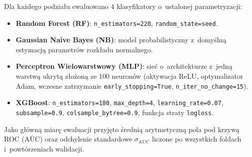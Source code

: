 Dla każdego podziału ewaluowano 4 klasyfikatory o~ustalonej parametryzacji:
\begin{itemize}
    \item \textbf{Random Forest (RF)}: \texttt{n\_estimators=220}, \texttt{random\_state=seed}.
    \item \textbf{Gaussian Naive Bayes (NB)}: model probabilistyczny z~domyślną estymacją parametrów rozkładu normalnego.
    \item \textbf{Perceptron Wielowarstwowy (MLP)}: sieć o~architekturze z~jedną warstwą ukrytą złożoną ze 100 neuronów (aktywacja ReLU, optymalizator Adam, wczesne zatrzymanie \texttt{early\_stopping=True}, \texttt{n\_iter\_no\_change=15}).
    \item \textbf{XGBoost}: \texttt{n\_estimators=180}, \texttt{max\_depth=4}, \texttt{learning\_rate=0.07}, \texttt{subsample=0.9}, \texttt{colsample\_bytree=0.9}, funkcja straty \texttt{logloss}.
\end{itemize}

Jako główną miarę ewaluacji przyjęto średnią arytmetyczną pola pod krzywą ROC ($\overline{\mathrm{AUC}}$) oraz odchylenie standardowe $\sigma_{\mathrm{AUC}}$ liczone po wszystkich foldach i~powtórzeniach walidacji.
